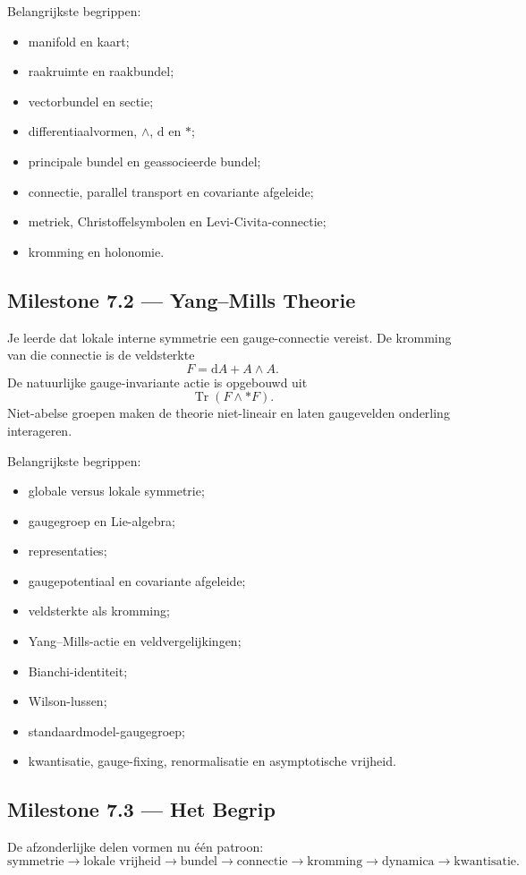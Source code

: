 \documentclass[11pt,a4paper]{article}
\newcommand{\dd}{\mathrm{d}}
\newcommand{\Tr}{\operatorname{Tr}}
\begin{document}
Belangrijkste begrippen:
\begin{itemize}
    \item manifold en kaart;
    \item raakruimte en raakbundel;
    \item vectorbundel en sectie;
    \item differentiaalvormen, $\wedge$, $\dd$ en $*$;
    \item principale bundel en geassocieerde bundel;
    \item connectie, parallel transport en covariante afgeleide;
    \item metriek, Christoffelsymbolen en Levi-Civita-connectie;
    \item kromming en holonomie.
\end{itemize}

\subsection*{Milestone 7.2 --- Yang--Mills Theorie}
Je leerde dat lokale interne symmetrie een gauge-connectie vereist. De kromming van die connectie is de veldsterkte
\[
F=\dd A+A\wedge A.
\]
De natuurlijke gauge-invariante actie is opgebouwd uit
\[
\Tr(F\wedge*F).
\]
Niet-abelse groepen maken de theorie niet-lineair en laten gaugevelden onderling interageren.

Belangrijkste begrippen:
\begin{itemize}
    \item globale versus lokale symmetrie;
    \item gaugegroep en Lie-algebra;
    \item representaties;
    \item gaugepotentiaal en covariante afgeleide;
    \item veldsterkte als kromming;
    \item Yang--Mills-actie en veldvergelijkingen;
    \item Bianchi-identiteit;
    \item Wilson-lussen;
    \item standaardmodel-gaugegroep;
    \item kwantisatie, gauge-fixing, renormalisatie en asymptotische vrijheid.
\end{itemize}

\subsection*{Milestone 7.3 --- Het Begrip}
De afzonderlijke delen vormen nu één patroon:
\[
\text{symmetrie} \to \text{lokale vrijheid} \to \text{bundel} \to \text{connectie} \to \text{kromming} \to \text{dynamica} \to \text{kwantisatie}.
\]
\end{document}
